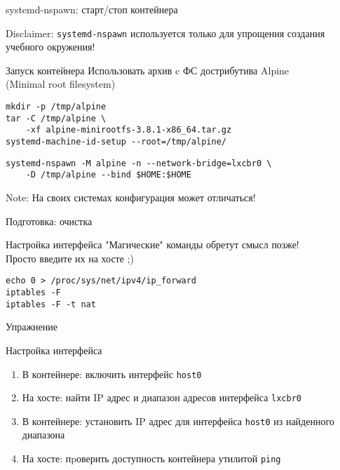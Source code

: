 \begin{frame}[fragile]{systemd-nspawn: старт/стоп контейнера}
    \begin{alert}{Disclaimer}:
        {\tt systemd-nspawn} используется только для упрощения создания учебного окружения!
    \end{alert}
    \begin{block}{Запуск контейнера}
        Использовать архив c ФС дострибутива Alpine \\ (Minimal root filesystem)

	\begin{verbatim}
mkdir -p /tmp/alpine
tar -C /tmp/alpine \
    -xf alpine-minirootfs-3.8.1-x86_64.tar.gz
systemd-machine-id-setup --root=/tmp/alpine/
\end{verbatim}

	\begin{verbatim}
systemd-nspawn -M alpine -n --network-bridge=lxcbr0 \
    -D /tmp/alpine --bind $HOME:$HOME
\end{verbatim}
    \end{block}
    {\tiny Note: На своих системах конфигурация может отличаться!}
\end{frame}

\begin{frame}[fragile]{Подготовка: очистка}
    \begin{block}{Настройка интерфейса}
    "Магические" команды обретут смысл позже!\\
    Просто введите их на хосте ;)
    \begin{verbatim}
echo 0 > /proc/sys/net/ipv4/ip_forward
iptables -F
iptables -F -t nat
\end{verbatim}
    \end{block}
\end{frame}

\begin{frame}{Упражнение}
    \begin{block}{Настройка интерфейса}
        \begin{enumerate}
            \item В контейнере: включить интерфейс {\tt host0}
            \item На хосте: найти IP адрес и диапазон адресов интерфейса {\tt lxcbr0}
            \item В контейнере: установить IP адрес для интерфейса {\tt host0} из найденного диапазона
            \item На хосте: пpоверить доступность контейнера утилитой {\tt ping}
        \end{enumerate}
    \end{block}
\end{frame}
